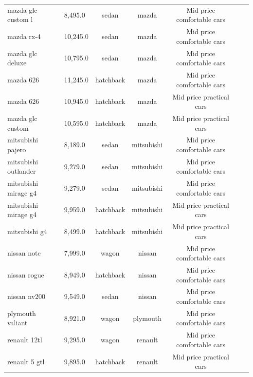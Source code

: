 \documentclass{article}
\begin{document}
\begin{longtable}{llccccl}
    mazda glc custom l       & 8,495.0             & sedan            & mazda          & Mid price comfortable cars \\
    mazda rx-4               & 10,245.0            & sedan            & mazda          & Mid price comfortable cars \\
    mazda glc deluxe         & 10,795.0            & sedan            & mazda          & Mid price comfortable cars \\
    mazda 626                & 11,245.0            & hatchback        & mazda          & Mid price comfortable cars \\
    mazda 626                & 10,945.0            & hatchback        & mazda          & Mid price practical cars   \\
    mazda glc custom         & 10,595.0            & hatchback        & mazda          & Mid price practical cars   \\
    mitsubishi pajero        & 8,189.0             & sedan            & mitsubishi     & Mid price comfortable cars \\
    mitsubishi outlander     & 9,279.0             & sedan            & mitsubishi     & Mid price comfortable cars \\
    mitsubishi mirage g4     & 9,279.0             & sedan            & mitsubishi     & Mid price comfortable cars \\
    mitsubishi mirage g4     & 9,959.0             & hatchback        & mitsubishi     & Mid price practical cars   \\
    mitsubishi g4            & 8,499.0             & hatchback        & mitsubishi     & Mid price practical cars   \\
    nissan note              & 7,999.0             & wagon            & nissan         & Mid price comfortable cars \\
    nissan rogue             & 8,949.0             & hatchback        & nissan         & Mid price comfortable cars \\
    nissan nv200             & 9,549.0             & sedan            & nissan         & Mid price comfortable cars \\
    plymouth valiant         & 8,921.0             & wagon            & plymouth       & Mid price comfortable cars \\
    renault 12tl             & 9,295.0             & wagon            & renault        & Mid price comfortable cars \\
    renault 5 gtl            & 9,895.0             & hatchback        & renault        & Mid price practical cars   \\

\end{longtable}
\end{document}
